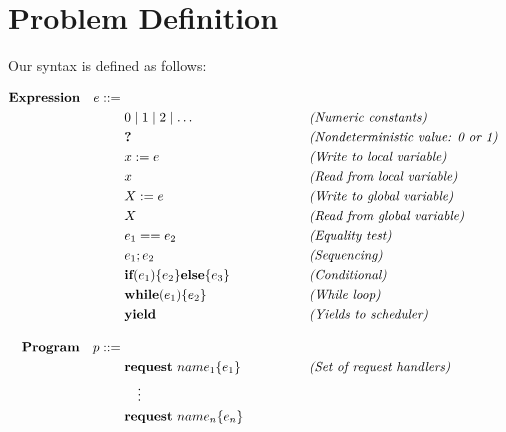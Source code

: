 
\section{Problem Definition}
\label{sec:problem-definition}

Our \toolname{} syntax is defined as follows: 

\[
\begin{aligned}
	\mathbf{Expression}\quad e ::={}&{} \\
	&0 \mid 1 \mid 2 \mid \dots 
	&&\qquad\qquad\emph{(Numeric constants)}\\
	&\textbf{?}
	&&\qquad\qquad\emph{(Nondeterministic value: 0 or 1)}\\
	&x := e
	&&\qquad\qquad\emph{(Write to local variable)}\\
	&x
	&&\qquad\qquad\emph{(Read from local variable)}\\
	&X := e
	&&\qquad\qquad\emph{(Write to global variable)}\\
	&X
	&&\qquad\qquad\emph{(Read from global variable)}\\
	&e_1 == e_2
	&&\qquad\qquad\emph{(Equality test)}\\
	&e_1 ; e_2
	&&\qquad\qquad\emph{(Sequencing)}\\
	&\textbf{if}(e_1)\{e_2\}\textbf{else}\{e_3\}
	&&\qquad\qquad\emph{(Conditional)}\\
	&\textbf{while}(e_1)\{e_2\}
	&&\qquad\qquad\emph{(While loop)}\\
	&\textbf{yield}
	&&\qquad\qquad\emph{(Yields to scheduler)}\\[1em]
	\mathbf{Program}\quad p ::={}&{} \\
	&\textbf{request}\ name_1\{e_1\}
	&&\qquad\qquad\emph{(Set of request handlers)}\\
	&\quad\vdots\\
	&\textbf{request}\ name_n\{e_n\}
\end{aligned}
\]

